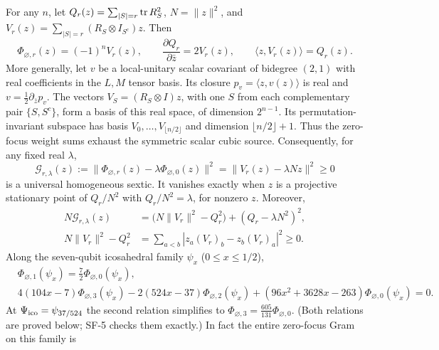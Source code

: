 \begin{proposition}
\label{prop:zero-focus}
For any $n$, let $Q_r(z)=\sum_{|S|=r}\operatorname{tr} R_S^2$, $N=\|z\|^2$,
and $V_r(z)=\sum_{|S|=r}(R_S\otimes I_{S^c})z$.
Then
\[
 \Phi_{\varnothing,r}(z)=(-1)^nV_r(z),\qquad
 \frac{\partial Q_r}{\partial\bar z}=2V_r(z),\qquad
 \langle z,V_r(z)\rangle=Q_r(z).
\]
More generally, let $v$ be a local-unitary scalar covariant of bidegree
$(2,1)$ with real coefficients in the $L,M$ tensor basis. Its closure
$p_v=\langle z,v(z)\rangle$ is real and
$v=\tfrac12\partial_{\bar z}p_v$.
The vectors $V_S=(R_S\otimes I)z$, with one $S$ from each complementary
pair $\{S,S^c\}$, form a basis of this real space, of dimension $2^{n-1}$.
Its permutation-invariant subspace has basis
$V_0,\ldots,V_{\lfloor n/2\rfloor}$ and dimension
$\lfloor n/2\rfloor+1$. Thus the zero-focus weight sums exhaust
the symmetric scalar cubic source.
Consequently, for any fixed real $\lambda$,
\begin{equation}\label{eq:gradient-sextic}
 \mathcal G_{r,\lambda}(z):=
 \|\Phi_{\varnothing,r}(z)-\lambda\Phi_{\varnothing,0}(z)\|^2
 =\|V_r(z)-\lambda Nz\|^2\ge0
\end{equation}
is a universal homogeneous sextic. It vanishes exactly when $z$
is a projective stationary point of $Q_r/N^2$ with
$Q_r/N^2=\lambda$, for nonzero $z$. Moreover,
\begin{equation}\label{eq:gradient-octic}
 \begin{split}
 N\mathcal G_{r,\lambda}(z)
 &=\bigl(N\|V_r\|^2-Q_r^2\bigr)+(Q_r-\lambda N^2)^2,\\
 N\|V_r\|^2-Q_r^2
 &=\sum_{a<b}|z_a(V_r)_b-z_b(V_r)_a|^2\ge0.
 \end{split}
\end{equation}
Along the seven-qubit icosahedral family $\psi_x$ ($0\le x\le1/2$),
\begin{equation}\label{eq:zero-focus-family}
\begin{aligned}
 &\Phi_{\varnothing,1}(\psi_x)=\tfrac72\Phi_{\varnothing,0}(\psi_x),\\
 &4(104x-7)\Phi_{\varnothing,3}(\psi_x)-2(524x-37)\Phi_{\varnothing,2}(\psi_x)
   +(96x^2+3628x-263)\Phi_{\varnothing,0}(\psi_x)=0.
\end{aligned}
\end{equation}
At $\Psi_{\mathrm{ico}}=\psi_{37/524}$ the second relation simplifies to
$\Phi_{\varnothing,3}=\frac{605}{131}\Phi_{\varnothing,0}$.
(Both relations are proved below; SF-5 checks them exactly.)
In fact the entire zero-focus Gram on this family is

\end{proposition}
